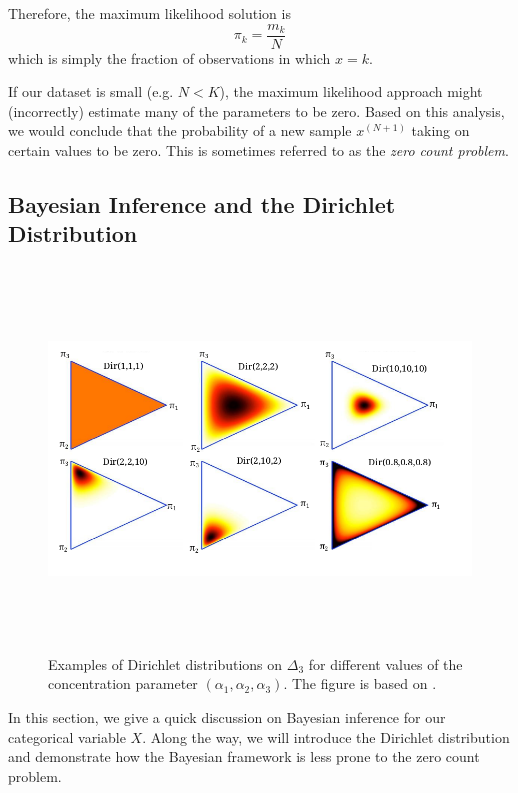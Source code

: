 \documentclass[final,3p,times,twocolumn]{elsarticle}
\begin{document}
Therefore, the maximum likelihood solution is 
\begin{equation*}
\label{eqn:catML}
\pi_k = \frac{m_k}{N}
\end{equation*}
which is simply the fraction of observations in which $x = k$.

If our dataset is small (e.g. $N < K$), the maximum likelihood approach might (incorrectly) estimate many of the parameters to be zero.
Based on this analysis, we would conclude that the probability of a new sample $x^{(N+1)}$ taking on certain values to be zero.
This is sometimes referred to as the \emph{zero count problem}.

\subsection{Bayesian Inference and the Dirichlet Distribution}
\label{sect:dirdistro}

\begin{figure}
\includegraphics[width=\textwidth,height=4in]{dir.png}
\caption{Examples of Dirichlet distributions on $\Delta_3$ for different values of the concentration parameter $(\alpha_1,\alpha_2,\alpha_3)$.
The figure is based on \cite{ywt07}.}
\label{fig:dir}
\end{figure}

In this section, we give a quick discussion on Bayesian inference for our categorical variable $X$.
Along the way, we will introduce the Dirichlet distribution and demonstrate how the Bayesian framework is less prone to the zero count problem.
\end{document}
